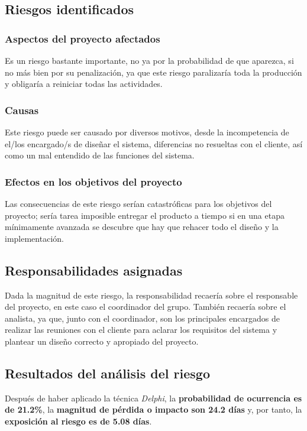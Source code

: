 \documentclass[11pt,a4paper,spanish,twoside]{book}
\begin{document}
\subsection{Riesgos identificados}
\subsubsection{Aspectos del proyecto afectados}
Es un riesgo bastante importante, no ya por la probabilidad de que aparezca,
si no más bien por su penalización, ya que este riesgo paralizaría toda la
producción y obligaría a reiniciar todas las actividades.

\subsubsection{Causas}
Este riesgo puede ser causado por diversos motivos, desde la incompetencia de
el/los encargado/s de diseñar el sistema, diferencias no resueltas con el
cliente, así como un mal entendido de las funciones del sistema.

\subsubsection{Efectos en los objetivos del proyecto}
Las consecuencias de este riesgo serían catastróficas para los objetivos del
proyecto; sería tarea imposible entregar el producto a tiempo si en una etapa
mínimamente avanzada se descubre que hay que rehacer todo el diseño y la
implementación. 

\subsection{Responsabilidades asignadas}
Dada la magnitud de este riesgo, la responsabilidad recaería sobre el
responsable del proyecto, en este caso el coordinador del grupo. También
recaería sobre el analista, ya que, junto con el coordinador, son los
principales encargados de realizar las reuniones con el cliente para aclarar
los requisitos del sistema y plantear un diseño correcto y apropiado del
proyecto.

\subsection{Resultados del análisis del riesgo}
Después de haber aplicado la técnica \emph{Delphi}, la \textbf{probabilidad de
ocurrencia es de 21.2\%}, la \textbf{magnitud de pérdida o impacto son 24.2
días} y, por tanto, la \textbf{exposición al riesgo es de 5.08 días}.
\end{document}
